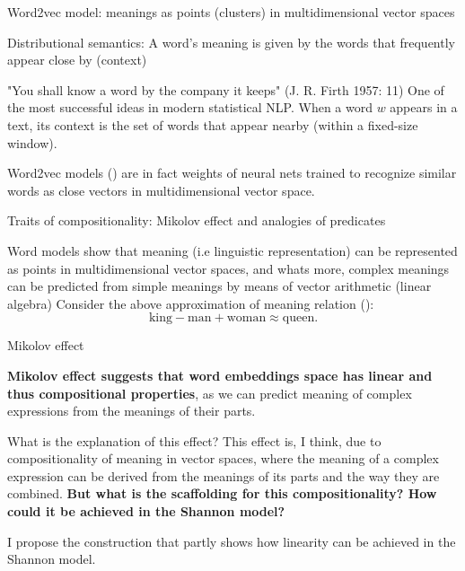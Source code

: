 \documentclass[10pt, aspectratio=169, handout]{beamer}
\begin{document}
\begin{frame}{Word2vec model: meanings as points (clusters) in multidimensional vector spaces}
    

    Distributional semantics: A word's meaning is given by the words that frequently appear close by (context)

    "You shall know a word by the company it keeps" (J. R. Firth 1957: 11)
    One of the most successful ideas in modern statistical NLP.
    When a word $w$ appears in a text, its context is the set of words that appear nearby (within a fixed-size window).

    Word2vec models (\cite{mikolov2013a}) are in fact weights of neural nets trained to recognize similar words as close vectors in multidimensional vector space.


\end{frame}

\begin{frame}{Traits of compositionality:  Mikolov effect and  analogies of predicates}

   Word models show that meaning (i.e linguistic representation) can be represented as points in multidimensional vector spaces, and whats more, complex meanings can be predicted from simple meanings by means of vector arithmetic (linear algebra)
    Consider the above approximation of meaning relation (\cite{mikolov2013a}):
   \huge $$\text{king} - \text{man} + \text{woman} \approx \text{queen}.$$

\end{frame}

\begin{frame}{Mikolov effect}

   
       
   \textbf{ Mikolov effect suggests that word embeddings space has linear and thus compositional properties}, as we can predict meaning of complex expressions from the meanings of their parts.
  

    What is the explanation of this effect?
    This effect is, I think,  due to  compositionality of meaning in vector spaces, where the meaning of a complex expression can be derived from the meanings of its parts and the way they are combined.
\textbf{
    But what is the scaffolding for this compositionality? How could it be achieved in the Shannon model? }
    
    I propose the construction that partly shows how linearity can be achieved in the Shannon model.

\end{frame}
\end{document}
